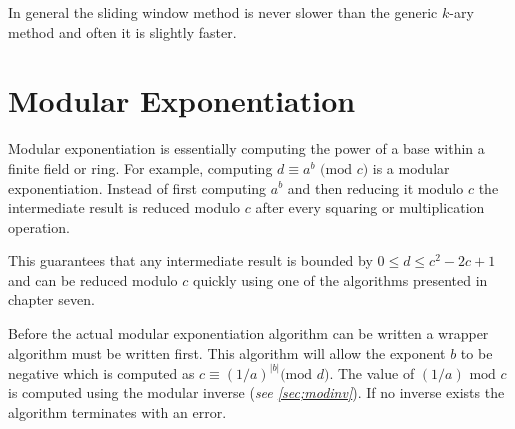 \documentclass[b5paper]{book}
\begin{document}
In general the sliding window method is never slower than the generic $k$-ary method and often it is slightly faster.  

\section{Modular Exponentiation}

Modular exponentiation is essentially computing the power of a base within a finite field or ring.  For example, computing 
$d \equiv a^b \mbox{ (mod }c\mbox{)}$ is a modular exponentiation.  Instead of first computing $a^b$ and then reducing it 
modulo $c$ the intermediate result is reduced modulo $c$ after every squaring or multiplication operation.  

This guarantees that any intermediate result is bounded by $0 \le d \le c^2 - 2c + 1$ and can be reduced modulo $c$ quickly using
one of the algorithms presented in chapter seven.  

Before the actual modular exponentiation algorithm can be written a wrapper algorithm must be written first.  This algorithm
will allow the exponent $b$ to be negative which is computed as $c \equiv \left (1 / a \right )^{\vert b \vert} \mbox{(mod }d\mbox{)}$. The
value of $(1/a) \mbox{ mod }c$ is computed using the modular inverse (\textit{see \ref{sec;modinv}}).  If no inverse exists the algorithm
terminates with an error.  
\end{document}
